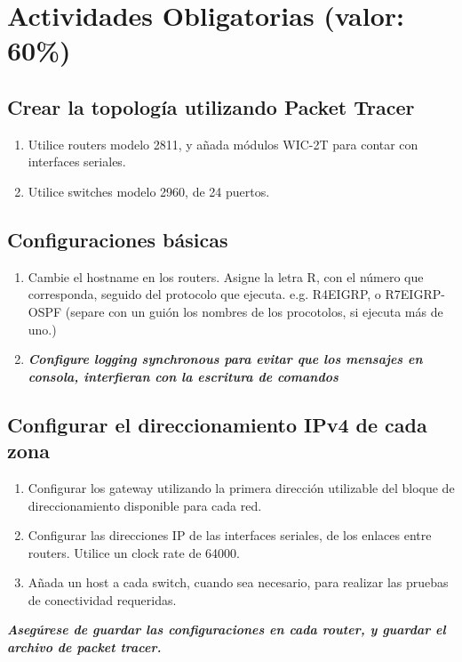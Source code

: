 \documentclass[12pt]{article}
\begin{document}
\section{Actividades Obligatorias (valor: 60\%)}
\subsection{Crear la topología utilizando Packet Tracer}
\begin{enumerate}[label=\Alph*]
\item Utilice routers modelo 2811, y añada módulos WIC-2T para contar con interfaces seriales.
\item Utilice switches modelo 2960, de 24 puertos.
\end{enumerate}

\subsection{Configuraciones básicas}
\begin{enumerate}[label=\Alph*]
\item Cambie el hostname en los routers. Asigne la letra R, con el número que corresponda, seguido del protocolo que ejecuta. e.g. R4EIGRP, o R7EIGRP-OSPF (separe con un guión los nombres de los procotolos, si ejecuta más de uno.)
\item \textit{\textbf{Configure logging synchronous para evitar que los mensajes en consola, interfieran con la escritura de comandos}}
\end{enumerate}

\subsection{Configurar el direccionamiento IPv4 de cada zona}


\begin{enumerate}[label=\Alph*]
\item Configurar los gateway utilizando la primera dirección utilizable del bloque de direccionamiento disponible para cada red.
\item Configurar las direcciones IP de las interfaces seriales, de los enlaces entre routers. Utilice un clock rate de 64000.
\item Añada un host a cada switch, cuando sea necesario, para realizar las pruebas de conectividad requeridas.
\end{enumerate}

\textit{\textbf{Asegúrese de guardar las configuraciones en cada router, y guardar el archivo de packet tracer.}}
\end{document}
